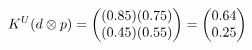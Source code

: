 \documentclass[preview]{standalone}
\begin{document}
\begin{align*}
\special{dvisvgm:raw <g id='unique000'>}K^U(d \otimes p) = \begin{pmatrix} (0.85)(0.75) \\ (0.45)(0.55) \end{pmatrix} = \begin{pmatrix} 0.64 \\ 0.25 \end{pmatrix}\special{dvisvgm:raw </g>}
\end{align*}
\end{document}
